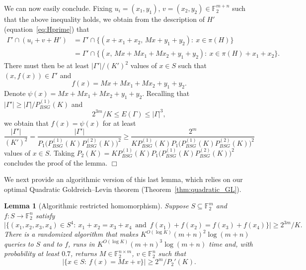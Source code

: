 \documentclass[11pt]{amsart}
\newcommand{\F}{\mathbb{F}} %
\theoremstyle{plain}
\newtheorem{lemma}[theorem]{Lemma}
\theoremstyle{definition}
\theoremstyle{remark}
\renewenvironment{proof}[1][]{
    	\begin{trivlist}
     	\item[\hspace{\labelsep}{\em\noindent Proof#1:\/}]}
     	{{\hfill$\Box$}
    	\end{trivlist}
  }
\begin{document}
\begin{proof}
We can now easily conclude.
Fixing $u_i = (x_1, y_1)$, $v = (x_2, y_2) \in \F_2^{m+n}$ such that the above inequality holds, we obtain from the description of $H'$ (equation~\eqref{eq:Hprime}) that
\begin{align*}
    \Gamma'\cap (u_i+v+H') &= \Gamma' \cap \big\{(x+x_1+x_2,\, Mx+y_1+y_2):\: x\in \pi(H)\big\} \\
    &= \Gamma' \cap \big\{(x,\, Mx + Mx_1 + Mx_2 + y_1 + y_2):\: x\in \pi(H)+x_1+x_2\big\}.
\end{align*}
There must then be at least $|\Gamma'|/(K')^2$ values of $x\in S$ such that $(x, f(x)) \in \Gamma'$ and
$$f(x) = Mx + Mx_1 + Mx_2 + y_1 + y_2.$$
Denote $\psi(x) = Mx + Mx_1 + Mx_2 + y_1 + y_2$.
Recalling that $|\Gamma'| \geq |\Gamma|/P_{BSG}^{(1)}(K)$ and
$$2^{3m}/K \leq E(\Gamma) \leq |\Gamma|^3,$$
we obtain that $f(x) = \psi(x)$ for at least
$$\frac{|\Gamma'|}{(K')^2} = \frac{|\Gamma'|}{P_1\big(P_{BSG}^{(1)}(K) P_{BSG}^{(2)}(K)\big)^2} \geq \frac{2^m}{K P_{BSG}^{(1)}(K) P_1\big(P_{BSG}^{(1)}(K) P_{BSG}^{(2)}(K)\big)^2}$$
values of $x\in S$.
Taking $P_2(K) = K P_{BSG}^{(1)}(K) P_1\big(P_{BSG}^{(1)}(K) P_{BSG}^{(2)}(K)\big)^2$ concludes the proof of the lemma.
\end{proof}

We next provide an algorithmic version of this last lemma, which relies on our optimal Quadratic Goldreich--Levin theorem (Theorem~\ref{thm:quadratic_GL}).

\begin{lemma}[Algorithmic restricted homomorphism]
\label{lem:findingaffine}
Suppose $S\subseteq \F_2^m$ and $f: S \to \F_2^n$ satisfy
$$\big|\big\{(x_1, x_2, x_3, x_4)\in S^4:\: x_1+x_2 = x_3+x_4 \,\text{ and }\, f(x_1)+f(x_2) = f(x_3)+f(x_4)\big\}\big| \geq 2^{3m}/K.$$
There is a randomized algorithm that makes $K^{O(\log K)} (m+n)^2 \log (m+n)$ queries to $S$ and to $f$, runs in $K^{O(\log K)} (m+n)^3 \log (m+n)$ time and, with probability at least $0.7$, returns $M\in \F_2^{n\times m}$, $v\in \F_2^n$ such that
$$\big|\big\{x\in S:\: f(x) = Mx+v\big\}\big| \geq 2^m/P_2'(K).$$
\end{lemma}
\end{document}
